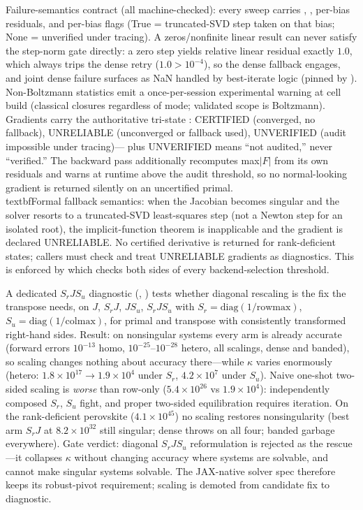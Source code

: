 Failure-semantics contract (all machine-checked): every sweep carries
, , per-bias residuals, and per-bias
 flags (True = truncated-SVD step taken on that
bias; None = unverified under tracing). A zeros/nonfinite linear result
can never satisfy the step-norm gate directly: a zero step yields
relative linear residual exactly $1.0$, which always trips the dense
retry ($1.0>10^{-4}$), so the dense fallback engages, and joint dense
failure surfaces as NaN handled by best-iterate logic (pinned by
). Non-Boltzmann
statistics emit a once-per-session experimental warning at cell build
(classical closures regardless of mode; validated scope is Boltzmann).
Gradients carry the authoritative tri-state :
CERTIFIED (converged, no fallback), UNRELIABLE (unconverged or fallback
used), UNVERIFIED (audit impossible under tracing)---
plus UNVERIFIED means ``not audited,'' never ``verified.'' The backward
pass additionally recomputes max$|F|$ from its own residuals and warns
at runtime above the audit threshold, so no normal-looking gradient is
returned silently on an uncertified primal.
\\textbf{Formal fallback semantics:} when the Jacobian becomes singular and
the solver resorts to a truncated-SVD least-squares step (not a Newton step
for an isolated root), the implicit-function theorem is inapplicable and the
gradient is declared UNRELIABLE. No certified derivative is returned for
rank-deficient states; callers must check  and
treat UNRELIABLE gradients as diagnostics. This is enforced by
 which checks both sides of every
backend-selection threshold.

A dedicated $S_rJS_u$ diagnostic (,
) tests whether diagonal
rescaling is the fix the transpose needs, on $J$, $S_rJ$, $JS_u$,
$S_rJS_u$ with $S_r=\mathrm{diag}(1/\mathrm{rowmax})$,
$S_u=\mathrm{diag}(1/\mathrm{colmax})$, for primal and transpose with
consistently transformed right-hand sides. Result: on nonsingular
systems every arm is already accurate (forward errors $10^{-13}$ homo,
$10^{-25}$--$10^{-28}$ hetero, all scalings, dense and banded), so
scaling changes nothing about accuracy there---while $\kappa$ varies
enormously (hetero: $1.8\times10^{17}\to1.9\times10^{4}$ under $S_r$,
$4.2\times10^{7}$ under $S_u$). Naive one-shot two-sided scaling is
\emph{worse} than row-only ($5.4\times10^{26}$ vs $1.9\times10^{4}$):
independently composed $S_r$, $S_u$ fight, and proper two-sided
equilibration requires iteration. On the rank-deficient perovskite
($4.1\times10^{45}$) no scaling restores nonsingularity (best arm $S_rJ$
at $8.2\times10^{32}$ still singular; dense throws on all four; banded
garbage everywhere). Gate verdict: diagonal $S_rJS_u$ reformulation is
rejected as the rescue---it collapses $\kappa$ without changing accuracy
where systems are solvable, and cannot make singular systems solvable.
The JAX-native solver spec therefore keeps its robust-pivot requirement;
scaling is demoted from candidate fix to diagnostic.

